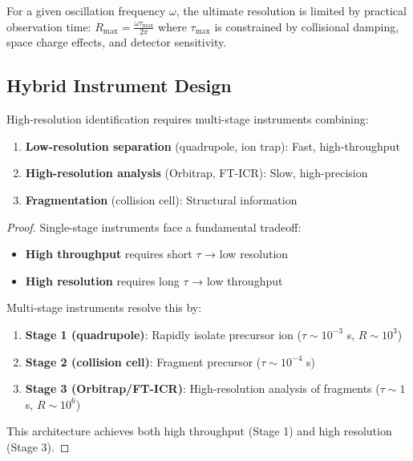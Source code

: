 \begin{corollary}
\label{cor:ultimate_limit}
For a given oscillation frequency $\omega$, the ultimate resolution is limited by practical observation time:
$
R_{\max} = \frac{\omega \tau_{\max}}{2\pi}
$
where $\tau_{\max}$ is constrained by collisional damping, space charge effects, and detector sensitivity.
\end{corollary}

\subsection{Hybrid Instrument Design}

\begin{proposition}
\label{prop:multistage}
High-resolution identification requires multi-stage instruments combining:
\begin{enumerate}
    \item \textbf{Low-resolution separation} (quadrupole, ion trap): Fast, high-throughput
    \item \textbf{High-resolution analysis} (Orbitrap, FT-ICR): Slow, high-precision
    \item \textbf{Fragmentation} (collision cell): Structural information
\end{enumerate}
\end{proposition}

\begin{proof}
Single-stage instruments face a fundamental tradeoff:
\begin{itemize}
    \item \textbf{High throughput} requires short $\tau$ → low resolution
    \item \textbf{High resolution} requires long $\tau$ → low throughput
\end{itemize}

Multi-stage instruments resolve this by:
\begin{enumerate}
    \item \textbf{Stage 1 (quadrupole)}: Rapidly isolate precursor ion ($\tau \sim 10^{-3}$ s, $R \sim 10^3$)
    \item \textbf{Stage 2 (collision cell)}: Fragment precursor ($\tau \sim 10^{-4}$ s)
    \item \textbf{Stage 3 (Orbitrap/FT-ICR)}: High-resolution analysis of fragments ($\tau \sim 1$ s, $R \sim 10^6$)
\end{enumerate}

This architecture achieves both high throughput (Stage 1) and high resolution (Stage 3).
\end{proof}

